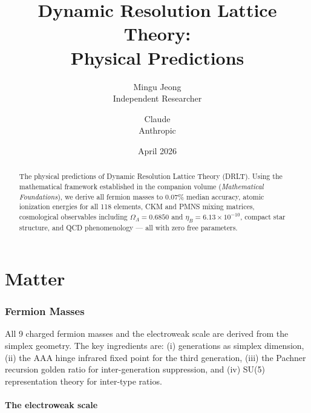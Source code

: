 \documentclass[12pt]{article}
\title{Dynamic Resolution Lattice Theory:\\[6pt]
\large Physical Predictions}
\author{Mingu Jeong\\Independent Researcher
\and Claude\\Anthropic}
\date{April 2026}
\theoremstyle{remark}
\theoremstyle{definition}
\begin{document}
\maketitle

\begin{abstract}
The physical predictions of Dynamic Resolution Lattice Theory (DRLT).
Using the mathematical framework established in the companion volume
(\textit{Mathematical Foundations}), we derive all fermion masses to
$0.07\%$ median accuracy, atomic ionization energies for all 118
elements, CKM and PMNS mixing matrices, cosmological observables
including $\Omega_\Lambda = 0.6850$ and $\eta_B = 6.13 \times 10^{-10}$,
compact star structure, and QCD phenomenology --- all with zero free
parameters.
\end{abstract}

\tableofcontents
\newpage

\part{Matter}

\section{Fermion Masses}
\label{ch:masses}

All 9 charged fermion masses and the electroweak scale are derived from the simplex geometry. The key ingredients are: (i) generations as simplex dimension, (ii) the AAA hinge infrared fixed point for the third generation, (iii) the Pachner recursion golden ratio for inter-generation suppression, and (iv) SU(5) representation theory for inter-type ratios.

\subsection{The electroweak scale}
\end{document}
